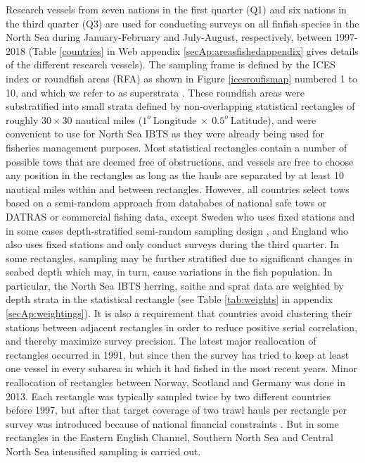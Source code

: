 \documentclass[a4paper 12pt]{article}
\numberwithin{equation}{section}
\begin{document}
Research vessels from seven nations in the first quarter (Q1) and six nations in the third quarter (Q3) are used for conducting surveys on all finfish species in the North Sea during January-February and July-August, respectively, between 1997-2018 (Table \ref{countries} in Web appendix \ref{secAp:areasfishedappendix} gives details of the different research vessels). The sampling frame is defined by the ICES index or roundfish areas (RFA) as shown in Figure \ref{icesroufismap} numbered 1 to 10, and which we refer to as superstrata \citep{nottestad2015quantifying, fuller2011sampling}. These  roundfish areas were substratified into small strata defined by non-overlapping statistical rectangles of roughly $30 \times 30$ nautical miles ($1^{o} \  \mathrm{Longitude} \ \times  \  0.5^{o} \ \mathrm{Latitude}$), and were convenient to use for North Sea IBTS as they were already being used for fisheries management purposes. Most statistical rectangles contain a number of possible tows that are deemed free of obstructions, and vessels are free to choose any position in the rectangles as long as the hauls are separated by at least 10 nautical miles within and between rectangles. However, all countries select tows based on a semi-random approach from datababes of national safe tows or DATRAS or commercial fishing data, except Sweden who uses fixed stations and in some cases depth-stratified semi-random sampling design \citep{ICES2018}, and England who also uses fixed stations and only conduct surveys during the third quarter. In some rectangles, sampling may be further stratified due to significant changes in seabed depth which may, in turn, cause variations in the fish population. In particular, the North Sea IBTS herring, saithe and sprat data are weighted by depth strata in the statistical rectangle (see Table \ref{tab:weights} in appendix \ref{secAp:weightings}). It is also a requirement that countries avoid clustering their stations between adjacent rectangles in order to reduce positive serial correlation, and thereby maximize survey precision.  The latest major reallocation of rectangles occurred in 1991, but since then the survey has tried to keep at least one vessel in every subarea in which it had fished in the most recent years. Minor reallocation of rectangles between Norway, Scotland and Germany was done in 2013. Each rectangle was  typically sampled twice by two different countries before 1997, but after that target coverage of two trawl hauls per rectangle per survey  was introduced because of national financial constraints \citep{ICES2015}. But in some rectangles in the Eastern English Channel, Southern North Sea and Central North Sea intensified sampling is carried out.\\
\end{document}

